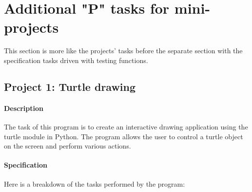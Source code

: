\documentclass[12pt]{book}
\begin{document}
\newpage


\chapter{Additional "P" tasks for mini-projects}

This section is more like the projects' tasks before the separate section with the specification tasks driven with testing functions. 

\section{Project 1: Turtle drawing }
\subsubsection{Description}

The task of this program is to create an interactive drawing application using the turtle module in Python. The program allows the user to control a turtle object on the screen and perform various actions. 

\subsubsection{Specification}
Here is a breakdown of the tasks performed by the program:
\end{document}
